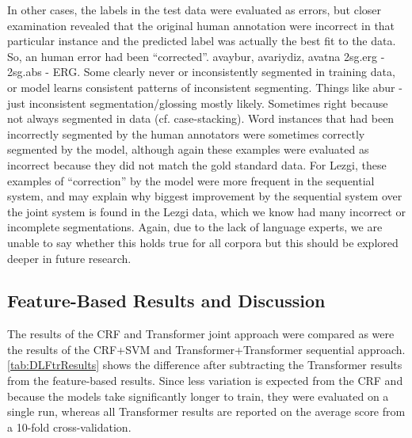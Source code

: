In other cases, the labels in the test data were evaluated as errors, but closer examination revealed that the original human annotation were incorrect in that particular instance and the predicted label was actually the best fit to the data. So, an human error had been ``corrected''. 
avaybur, avariydiz, avatna 2sg.erg - 2sg.abs - ERG.  Some clearly never or inconsistently segmented in training data, or model learns consistent patterns of inconsistent segmenting. Things like  abur -\textrangle{} just inconsistent segmentation/glossing mostly likely. Sometimes right because not always segmented in data (cf. case-stacking). 
Word instances that had been incorrectly segmented by the human annotators were sometimes correctly segmented by the model, although again these examples were evaluated as incorrect because they did not match the gold standard data. For Lezgi, these examples of ``correction'' by the model were more frequent in the sequential system, and may explain why biggest improvement by the sequential system over the joint system is found in the Lezgi data, which we know had many incorrect or incomplete segmentations.  Again, due to the lack of language experts, we are unable to say whether this holds true for all corpora but this should be explored deeper in future research.


\subsection{Feature-Based Results and Discussion}

The results of the CRF and Transformer joint approach were compared as were the results of the CRF+SVM and Transformer+Transformer sequential approach. \autoref{tab:DLFtrResults} shows the difference after subtracting the Transformer results from the feature-based results. Since less variation is expected from the CRF and because the models take significantly longer to train, they were evaluated on a single run, whereas all Transformer results are reported on the average score from a 10-fold cross-validation. 

